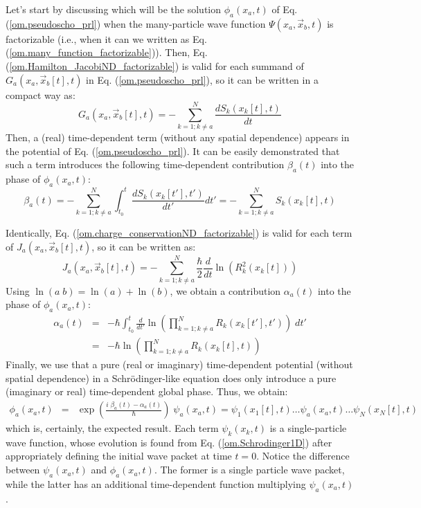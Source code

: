 \documentclass[onecolumn,nofootinbib, secnumarabic, amsmath, nobibnotes,11pt,aps,pra]{revtex4-1}
\newcommand{\eref}[1]{Eq. (\ref{#1})}
\begin{document}
Let's start by discussing which  will be the solution
$\phi_{a}(x_{a},t)$ of \eref{om.pseudoscho_prl} when the
many-particle wave function $\Psi(x_a,\vec x_b,t)$ is factorizable
(i.e., when it can we written as
\eref{om.many_function_factorizable}). Then,
\eref{om.Hamilton_JacobiND_factorizable} is valid for each summand
of $G_{a}(x_{a},\vec x_{b}[t],t)$ in
\eref{om.pseudoscho_prl}, so it can be written in a compact way as:
\begin{equation}
\label{om.prlpas_factorizable1}
G_{a}(x_{a},\vec x_{b}[t],t) = -\sum_{k = 1;k\neq a}^{N} \frac {d S_k(x_k[t],t)} {dt}
\end{equation}
Then, a (real) time-dependent term (without any spatial dependence)
appears in the potential of \eref{om.pseudoscho_prl}. It can be
easily demonstrated that such a term introduces the following
time-dependent contribution  \textit{$ \beta_a(t)$} into the phase of
$\phi_a(x_a,t)$:
\begin{equation}
\label{om.prlbeta}
\beta_a(t) = - \sum_{k = 1;k\neq a}^{N} \int_{t_0}^{t} \frac {d S_k(x_k[t'],t')} {dt'} dt' = -\sum_{k = 1;k\neq a}^{N} S_k(x_k[t],t)
\end{equation}

Identically, \eref{om.charge_conservationND_factorizable} is valid for each term of $J_{a}(x_{a},\vec x_{b}[t],t)$, so it can be written as:
\begin{equation}
\label{om.prlpas_factorizable2}
J_{a}(x_{a},\vec x_{b}[t],t) = -\sum_{k = 1;k\neq a}^{N} \frac {\hbar} {2} \frac {d} {dt} \ln \left( R_{k}^2(x_k[t]) \right)
\end{equation}
Using $\ln (a \; b) = \ln (a) + \ln (b)$, we obtain a contribution  $\alpha_a(t)$ into the phase of $\phi_a(x_a,t)$:
\begin{eqnarray}
\label{om.prlalpha} \alpha_a(t) &=& -\hbar \int_{t_0}^{t} \frac {d}
{dt'} \ln \left( \prod_{k = 1;k\neq a}^{N} R_k(x_k[t'],t') \right) \;
dt'\nonumber\\ &=& -\hbar \ln \left( \prod_{k = 1;k\neq a}^{N}
R_k(x_k[t],t) \right)
\end{eqnarray}
Finally, we use that a pure (real or imaginary) time-dependent
potential (without spatial dependence) in a Schr\"odinger-like
equation does only introduce a pure (imaginary or real)
time-dependent global phase. Thus, we obtain:
\begin{eqnarray}
\label{om.prlpas_factorizable3}
\phi_a(x_a,t) &=& \exp\left(\frac {i \; \beta_a(t)-\alpha_a(t)} {\hbar}\right) \;\psi_a(x_a,t)= \psi_1(x_1[t],t)\ldots\psi_a(x_a,t)\ldots\psi_N(x_N[t],t)
\end{eqnarray}
which is, certainly, the expected result. Each term \textit{$\psi_k(x_k,t)$} is a single-particle wave function, whose evolution is found from \eref{om.Schrodinger1D} after appropriately defining the initial wave packet at time $t = 0$. Notice the difference between $\psi_a(x_a,t)$ and $\phi_a(x_a,t)$. The former is a single particle wave packet, while the latter has an additional time-dependent function multiplying $\psi_a(x_a,t)$.
\end{document}
